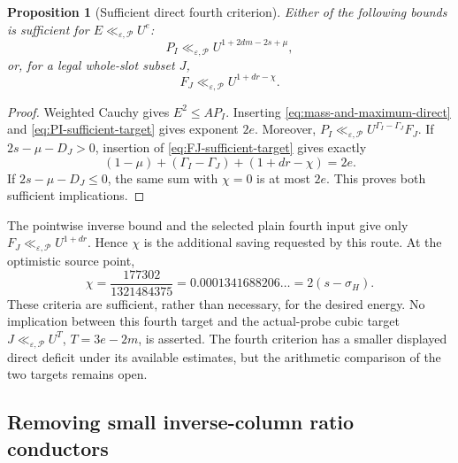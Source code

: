 \documentclass[11pt]{article}
\newtheorem{proposition}[theorem]{Proposition}
\theoremstyle{definition}
\newcommand{\eps}{\varepsilon}
\newcommand{\lls}{\ll_{\eps,\mathcal P}}
\begin{document}
\begin{proposition}[Sufficient direct fourth criterion]
\label{prop:inverse-fourth-criterion}
Either of the following bounds is sufficient for \(E\lls U^e\):
\begin{equation}
 P_I\lls U^{1+2dm-2s+\mu},
 \label{eq:PI-sufficient-target}
\end{equation}
or, for a legal whole-slot subset \(J\),
\begin{equation}
 F_J\lls U^{1+dr-\chi}.
 \label{eq:FJ-sufficient-target}
\end{equation}
\end{proposition}
\begin{proof}
Weighted Cauchy gives \(E^2\le AP_I\).  Inserting
\eqref{eq:mass-and-maximum-direct} and
\eqref{eq:PI-sufficient-target} gives exponent \(2e\).
Moreover,
\(P_I\lls U^{\Gamma_I-\Gamma_J}F_J\).  If
\(2s-\mu-D_J>0\), insertion of
\eqref{eq:FJ-sufficient-target} gives exactly
\[
 (1-\mu)+(\Gamma_I-\Gamma_J)+(1+dr-\chi)=2e.
\]
If \(2s-\mu-D_J\le0\), the same sum with \(\chi=0\) is at most
\(2e\).  This proves both sufficient implications.
\end{proof}

The pointwise inverse bound and the selected plain fourth input give
only \(F_J\lls U^{1+dr}\).  Hence \(\chi\) is the additional saving
requested by this route.  At the optimistic source point,
\begin{equation}
 \chi=\frac{177302}{1321484375}
      =0.0001341688206\ldots=2(s-\sigma_H).
 \label{eq:exact-inverse-fourth-deficit}
\end{equation}
These criteria are sufficient, rather than necessary, for the desired
energy.  No implication between this fourth target and the actual-probe
cubic target \(J\lls U^T\), \(T=3e-2m\), is asserted.  The fourth
criterion has a smaller displayed direct deficit under its available
estimates, but the arithmetic comparison of the two targets remains
open.

\subsection{Removing small inverse-column ratio conductors}
\end{document}
